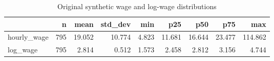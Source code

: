 \begin{table}[htbp]
\centering
\caption{Original synthetic wage and log-wage distributions}
\begingroup
\small
\setlength{\tabcolsep}{6pt}
\renewcommand{\arraystretch}{1.12}
\begin{adjustbox}{max width=\linewidth}
\begin{tabular}{@{}lrrrrrrrr@{}}
\toprule
 & n & mean & std\_dev & min & p25 & p50 & p75 & max \\
\midrule
hourly\_wage & 795 & 19.052 & 10.774 & 4.823 & 11.681 & 16.644 & 23.477 & 114.862 \\
log\_wage & 795 & 2.814 & 0.512 & 1.573 & 2.458 & 2.812 & 3.156 & 4.744 \\
\bottomrule
\end{tabular}
\end{adjustbox}
\endgroup
\end{table}